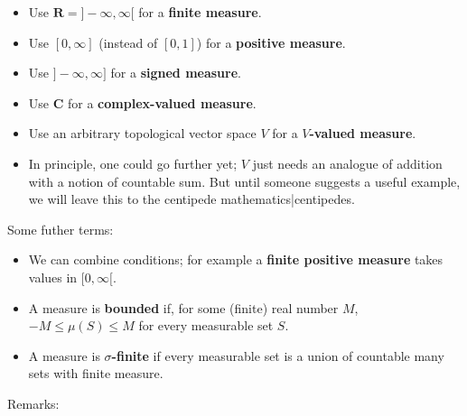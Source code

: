 \documentclass[preprint, 5p, 10pt]{elsarticle}
\theoremstyle{plain}
\begin{document}
\begin{itemize}%
\item Use $\mathbf{R} = ]-\infty,\infty[$ for a \textbf{finite measure}.
\item Use $[0,\infty]$ (instead of $[0,1]$) for a \textbf{positive measure}.
\item Use $]-\infty,\infty]$ for a \textbf{signed measure}.
\item Use $\mathbf{C}$ for a \textbf{complex-valued measure}.
\item Use an arbitrary topological vector space $V$ for a \textbf{$V$-valued measure}.
\item In principle, one could go further yet; $V$ just needs an analogue of addition with a notion of countable sum. But until someone suggests a useful example, we will leave this to the centipede mathematics|centipedes.

\end{itemize}
Some futher terms:

\begin{itemize}%
\item We can combine conditions; for example a \textbf{finite positive measure} takes values in $[0,\infty[$.
\item A measure is \textbf{bounded} if, for some (finite) real number $M$, $-M \leq \mu(S) \leq M$ for every measurable set $S$.
\item A measure is \textbf{$\sigma$-finite} if every measurable set is a union of countable many sets with finite measure.

\end{itemize}
Remarks:
\end{document}
